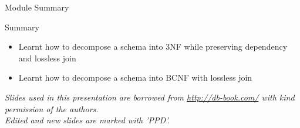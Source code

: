 \documentclass[aspectratio=169, xcolor=dvipsnames]{beamer}
\begin{document}
\begin{frame}{Module Summary}
    \begin{block}{Summary}
        \begin{itemize}[<+->]
            \item Learnt how to decompose a schema into 3NF while preserving dependency and lossless join
            \item Learnt how to decompose a schema into BCNF with lossless join
        \end{itemize}
    \end{block}
    \vspace{2em}
    \begin{center}
    \small \textit{Slides used in this presentation are borrowed from \url{http://db-book.com/} with kind permission of the authors.} \\
    \small \textit{Edited and new slides are marked with 'PPD'.}
    \end{center}
\end{frame}
\end{document}
